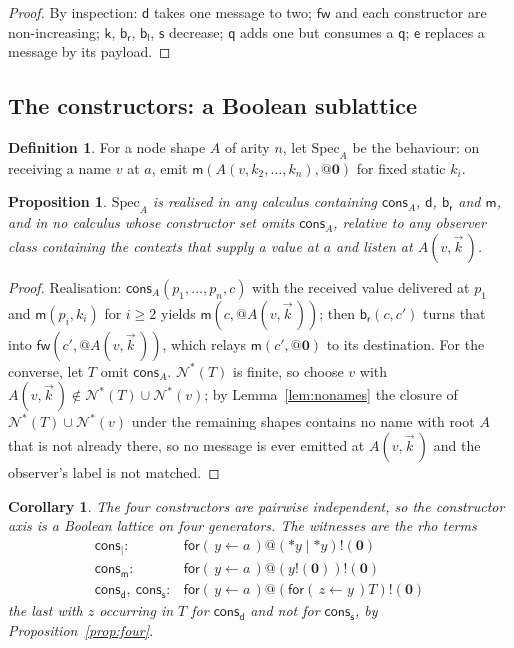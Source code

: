\documentclass[11pt]{article}
\makeatletter
\theoremstyle{plain}
\newtheorem{proposition}[theorem]{Proposition}
\newtheorem{corollary}[theorem]{Corollary}
\theoremstyle{definition}
\newtheorem{definition}[theorem]{Definition}
\theoremstyle{remark}
\newcommand{\quo}[1]{@#1}
\newcommand{\drp}[1]{{*}#1}
\newcommand{\inp}[3]{\mathsf{for}(\,#1 \leftarrow #2\,)#3}
\newcommand{\out}[2]{#1!(#2)}
\newcommand{\nil}{\mathbf{0}}
\newcommand{\nms}[1]{\mathcal{N}^{*}(#1)}
\newcommand{\mm}{\mathsf{m}}
\newcommand{\dd}{\mathsf{d}}
\newcommand{\kk}{\mathsf{k}}
\newcommand{\fw}{\mathsf{fw}}
\newcommand{\bl}{\mathsf{b}_{\mathsf{l}}}
\newcommand{\br}{\mathsf{b}_{\mathsf{r}}}
\newcommand{\sy}{\mathsf{s}}
\newcommand{\ev}{\mathsf{e}}
\newcommand{\qq}{\mathsf{q}}
\newcommand{\cons}{\mathsf{cons}}
\makeatother
\begin{document}
\begin{proof}
By inspection: $\dd$ takes one message to two; $\fw$ and each constructor are
non-increasing; $\kk$, $\br$, $\bl$, $\sy$ decrease; $\qq$ adds one but
consumes a $\qq$; $\ev$ replaces a message by its payload.
\end{proof}

\subsection{The constructors: a Boolean sublattice}

\begin{definition}
For a node shape $A$ of arity $n$, let $\mathrm{Spec}_{A}$ be the behaviour:
on receiving a name $v$ at $a$, emit $\mm(A(v,k_{2},\dots,k_{n}),\quo{\nil})$
for fixed static $k_{i}$.
\end{definition}

\begin{proposition}
\label{prop:consedges}
$\mathrm{Spec}_{A}$ is realised in any calculus containing $\cons_{A}$,
$\dd$, $\br$ and $\mm$, and in no calculus whose constructor set omits
$\cons_{A}$, relative to any observer class containing the contexts that
supply a value at $a$ and listen at $A(v,\vec k\,)$.
\end{proposition}

\begin{proof}
Realisation: $\cons_{A}(p_{1},\dots,p_{n},c)$ with the received value
delivered at $p_{1}$ and $\mm(p_{i},k_{i})$ for $i \geq 2$ yields
$\mm(c,\quo{A(v,\vec k\,)})$; then $\br(c,c')$ turns that into
$\fw(c',\quo{A(v,\vec k\,)})$, which relays $\mm(c',\quo{\nil})$ to its
destination. For the converse, let $T$ omit $\cons_{A}$. $\nms{T}$ is finite,
so choose $v$ with $A(v,\vec k\,) \notin \nms{T} \cup \nms{v}$; by
Lemma~\ref{lem:nonames} the closure of $\nms{T} \cup \nms{v}$ under the
remaining shapes contains no name with root $A$ that is not already there, so
no message is ever emitted at $A(v,\vec k\,)$ and the observer's label is not
matched.
\end{proof}

\begin{corollary}
\label{cor:boolean}
The four constructors are pairwise independent, so the constructor axis is a
Boolean lattice on four generators. The witnesses are the rho terms
\[
\begin{array}{ll}
  \cons_{\mid}: & \inp{y}{a}{\out{\quo{(\drp{y} \mid \drp{y})}}{\nil}}\\
  \cons_{\mm}: & \inp{y}{a}{\out{\quo{(\out{y}{\nil})}}{\nil}}\\
  \cons_{\dd},\ \cons_{\sy}: & \inp{y}{a}{\out{\quo{(\inp{z}{y}{T})}}{\nil}}
\end{array}
\]
the last with $z$ occurring in $T$ for $\cons_{\dd}$ and not for
$\cons_{\sy}$, by Proposition~\ref{prop:four}.
\end{corollary}
\end{document}
